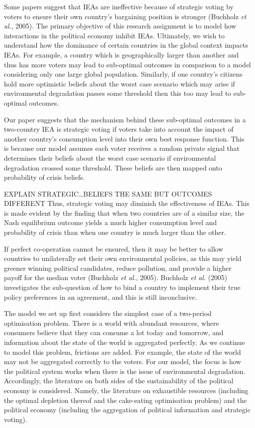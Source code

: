 \documentclass[11pt,preprint, authoryear]{elsarticle}
\numberwithin{equation}{section}
\numberwithin{figure}{section}
\numberwithin{table}{section}
\begin{document}
Some papers suggest that IEAs are ineffective because of strategic
voting by voters to ensure their own country's bargaining position is
stronger (Buchholz \emph{et al.}, 2005). The primary objective of this
research assignment is to model how interactions in the political
economy inhibit IEAs. Ultimately, we wish to understand how the
dominance of certain countries in the global context impacts IEAs. For
example, a country which is geographically larger than another and thus
has more voters may lead to sub-optimal outcomes in comparison to a
model considering only one large global population. Similarly, if one
country's citizens hold more optimistic beliefs about the worst case
scenario which may arise if environmental degradation passes some
threshold then this too may lead to sub-optimal outcomes.

Our paper suggests that the mechanism behind these sub-optimal outcomes
in a two-country IEA is strategic voting if voters take into account the
impact of another country's consumption level into their own best
response function. This is because our model assumes each voter receives
a random private signal that determines their beliefs about the worst
case scenario if environmental degradation crossed some threshold. These
beliefs are then mapped onto probability of crisis beliefs.

EXPLAIN STRATEGIC\ldots BELIEFS THE SAME BUT OUTCOMES DIFFERENT Thus,
strategic voting may diminish the effectiveness of IEAs. This is made
evident by the finding that when two countries are of a similar size,
the Nash equilibrium outcome yields a much higher consumption level and
probability of crisis than when one country is much larger than the
other.

If perfect co-operation cannot be ensured, then it may be better to
allow countries to unilaterally set their own environmental policies, as
this may yield greener winning political candidates, reduce pollution,
and provide a higher payoff for the median voter (Buchholz \emph{et
al.}, 2005). Buchholz \emph{et al.} (2005) investigates the sub-question
of how to bind a country to implement their true policy preferences in
an agreement, and this is still inconclusive.

The model we set up first considers the simplest case of a two-period
optimisation problem. There is a world with abundant resources, where
consumers believe that they can consume a lot today and tomorrow, and
information about the state of the world is aggregated perfectly. As we
continue to model this problem, frictions are added. For example, the
state of the world may not be aggregated correctly to the voters. For
our model, the focus is how the political system works when there is the
issue of environmental degradation. Accordingly, the literature on both
sides of the sustainability of the political economy is considered.
Namely, the literature on exhaustible resources (including the optimal
depletion thereof and the cake-eating optimisation problem) and the
political economy (including the aggregation of political information
and strategic voting).
\end{document}
